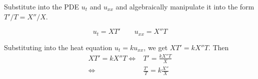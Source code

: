 Substitute into the PDE $u_t$ and $u_{xx}$ and algebraically manipulate it into the form $T'/T = X''/X$.

\soln*
$$u_t = XT' \qquad u_{xx} = X''T$$

Substituting into the heat equation $u_t = ku_{xx}$, we get $XT' = kX''T$. Then
\begin{align*}
    XT' = kX''T  \iff & T' = \frac{kX''T}{X}\\
    \iff & \frac{T'}{T} = k\frac{X''}{X}  
\end{align*}
